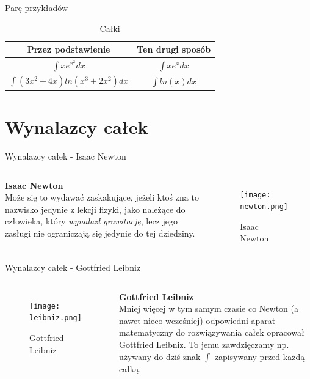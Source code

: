 \documentclass[aspectratio=169,xcolor=dvipsnames]{beamer}
\begin{document}
\begin{frame}{Parę przykładów}
    \begin{table}
        \begin{tabular}{c | c}
            \toprule
            \textbf{Przez podstawienie} & \textbf{Ten drugi sposób} \\
            \midrule
            $\int x e^{x^2}dx$ & $\int x e^xdx$              \\
            $\int (3x^2 + 4x)ln(x^3 + 2x^2)dx$ & $\int ln(x)dx$             \\      
            \bottomrule
        \end{tabular}
        \caption{\label{tab:całki}Całki}
    \end{table}
\end{frame}

\section{Wynalazcy całek}

\begin{frame}{Wynalazcy całek - Isaac Newton}
    \begin{columns}[c]

        \textbf{Isaac Newton}\\
        Może się to wydawać zaskakujące, jeżeli ktoś zna to nazwisko jedynie z lekcji fizyki, jako należące do człowieka, który \textit{wynalazł grawitację}, lecz jego zasługi nie ograniczają się jedynie do tej dziedziny.

        \begin{figure}
            \centering
            \texttt{[image: newton.png]}
            \caption{\label{fig:Newton}Isaac Newton}
        \end{figure}

    \end{columns}
\end{frame}


\begin{frame}{Wynalazcy całek - Gottfried Leibniz}
    \begin{columns}[c]

        \begin{figure}
            \centering
            \texttt{[image: leibniz.png]}
            \caption{\label{fig:Leibniz}Gottfried Leibniz}
        \end{figure}
        
        \textbf{Gottfried Leibniz}\\
        Mniej więcej w tym samym czasie co Newton (a nawet nieco wcześniej) odpowiedni aparat matematyczny do rozwiązywania całek opracował Gottfried Leibniz. To jemu zawdzięczamy np. używany do dziś znak $\int$ zapisywany przed każdą całką.

    \end{columns}
\end{frame}
\end{document}
